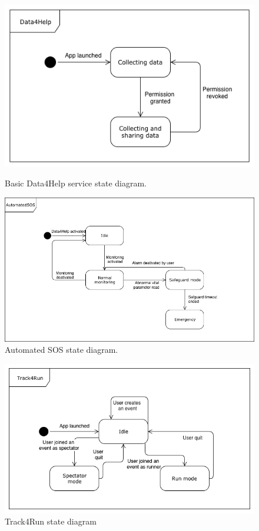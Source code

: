\documentclass{article}
\begin{document}
\begin{figure}[h!]
  \includegraphics[width=\textwidth]{Figures/State1}
  \caption{Basic Data4Help service state diagram.}
  \label{fig:State1}
  
  \includegraphics[width=\textwidth]{Figures/State2}
  \caption{Automated SOS state diagram.}
  \label{fig:State2}
\end{figure}

\newpage
	
\begin{figure}[h!]
  \includegraphics[width=\textwidth]{Figures/State3}
  \caption{Track4Run state diagram}
  \label{fig:State3.}
\end{figure}
\newpage
\end{document}
